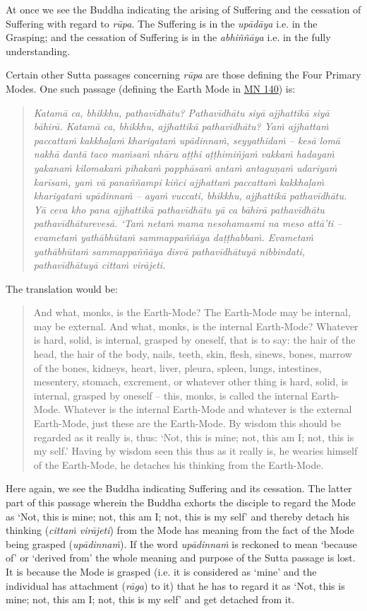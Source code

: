 At once we see the Buddha indicating the arising of Suffering and the cessation of Suffering with regard to \emph{rūpa}. The Suffering is in the \emph{upādāya} i.e. in the Grasping; and the cessation of Suffering is in the \emph{abhiññāya} i.e. in the fully understanding.

Certain other Sutta passages concerning \emph{rūpa} are those defining the Four Primary Modes. One such passage (defining the Earth Mode in \href{https://suttacentral.net/mn140/en/bodhi}{MN 140}) is:

\begin{quote}
\emph{Katamā ca, bhikkhu, pathavīdhātu? Pathavīdhātu siyā ajjhattikā siyā bāhirā. Katamā ca, bhikkhu, ajjhattikā pathavīdhātu? Yaṁ ajjhattaṁ paccattaṁ kakkhaḷaṁ kharigataṁ upādinnaṁ, seyyathidaṁ -- kesā lomā nakhā dantā taco maṁsaṁ nhāru aṭṭhi aṭṭhimiñjaṁ vakkaṁ hadayaṁ yakanaṁ kilomakaṁ pihakaṁ papphāsaṁ antaṁ antaguṇaṁ udariyaṁ karīsaṁ, yaṁ vā panaññampi kiñci ajjhattaṁ paccattaṁ kakkhaḷaṁ kharigataṁ upādinnaṁ -- ayaṁ vuccati, bhikkhu, ajjhattikā pathavīdhātu. Yā ceva kho pana ajjhattikā pathavīdhātu yā ca bāhirā pathavīdhātu pathavīdhāturevesā. `Taṁ netaṁ mama nesohamasmi na meso attā'ti -- evametaṁ yathābhūtaṁ sammappaññāya daṭṭhabbaṁ. Evametaṁ yathābhūtaṁ sammappaññāya disvā pathavīdhātuyā nibbindati, pathavīdhātuyā cittaṁ virājeti.}
\end{quote}

The translation would be:

\begin{quote}
And what, monks, is the Earth-Mode? The Earth-Mode may be internal, may be external. And what, monks, is the internal Earth-Mode? Whatever is hard, solid, is internal, grasped by oneself, that is to say: the hair of the head, the hair of the body, nails, teeth, skin, flesh, sinews, bones, marrow of the bones, kidneys, heart, liver, pleura, spleen, lungs, intestines, mesentery, stomach, excrement, or whatever other thing is hard, solid, is internal, grasped by oneself -- this, monks, is called the internal Earth-Mode. Whatever is the internal Earth-Mode and whatever is the external Earth-Mode, just these are the Earth-Mode. By wisdom this should be regarded as it really is, thus: `Not, this is mine; not, this am I; not, this is my self.' Having by wisdom seen this thus as it really is, he wearies himself of the Earth-Mode, he detaches his thinking from the Earth-Mode.
\end{quote}

Here again, we see the Buddha indicating Suffering and its cessation. The latter part of this passage wherein the Buddha exhorts the disciple to regard the Mode as `Not, this is mine; not, this am I; not, this is my self' and thereby detach his thinking (\emph{cittaṁ virājeti}) from the Mode has meaning  from the fact of the Mode being grasped (\emph{upādinnaṁ}). If the word \emph{upādinnaṁ} is reckoned to mean `because of' or `derived from' the whole meaning and purpose of the Sutta passage is lost. It is because the Mode is grasped (i.e. it is considered as `mine' and the individual has attachment (\emph{rāga}) to it) that he has to regard it as `Not, this is mine; not, this am I; not, this is my self' and get detached from it.

